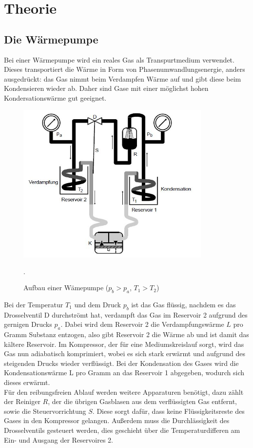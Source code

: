 \section{Theorie}
\subsection{Die Wärmepumpe}
Bei einer Wärmepumpe wird ein reales Gas als Transpurtmedium verwendet. Dieses transportiert die
Wärme in Form von Phasenumwandlungsenergie, anders ausgedrückt: das Gas nimmt beim
Verdampfen Wärme auf und gibt diese beim Kondensieren wieder ab.
Daher sind Gase mit einer möglichst hohen Kondersationswärme gut geeignet.
\begin{figure}[H]
  \centering
  \includegraphics[height=8cm]{Pumpe.JPG}
  \caption{Aufbau einer Wämepumpe ($p_{b}>p_{a}$, $T_{1}>T_{2}$)}
  \cite{skript}.
  \label{fig:pumpe}
\end{figure}
Bei der Temperatur $T_{1}$ und dem Druck $p_{b}$ ist das Gas flüssig, nachdem es das Drosselventil D durchströmt
hat, verdampft das Gas im Reservoir 2 aufgrund des gernigen Drucks $p_{a}$. Dabei wird dem
Reservoir 2 die Verdampfungswärme $L$ pro Gramm Substanz entzogen, also gibt Reservoir 2 die Wärme ab und ist
damit das kältere Reservoir. Im Kompressor, der für eine Mediumskreislauf sorgt, wird das Gas nun
adiabatisch komprimiert, wobei es sich stark erwärmt und aufgrund des steigenden Drucks wieder verflüssigt.
Bei der Kondensation des Gases wird die Kondensationswärme L pro Gramm an das Reservoir 1 abgegeben, wodurch sich
dieses erwärmt.\\
Für den reibungsfreien Ablauf werden weitere Apparaturen benötigt, dazu zählt der Reiniger $R$, der
die übrigen Gasblasen aus dem verflüssigten Gas entfernt, sowie die Steuervorrichtung $S$.
Diese sorgt dafür, dass keine Flüssigkeitsreste des Gases in den Kompressor gelangen.
Außerdem muss die Durchlässigkeit des Drosselventils gesteuert werden, dies geschieht über
die Temperaturdifferen am Ein- und Ausgang der Reservoires 2.

